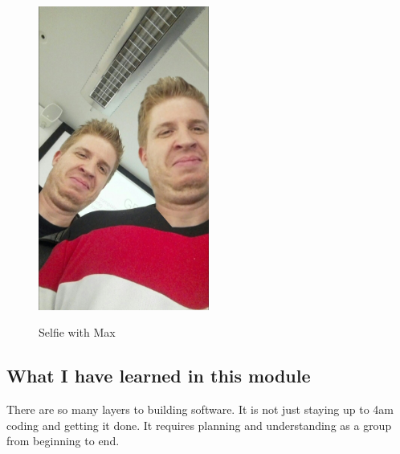 \begin{figure}[h]
\caption{Selfie with Max}
\centering
\includegraphics[width=0.5\textwidth]{af48bcf9-8756-467e-bd54-b3275c9d5df9.jpg}
\label{fig:selfie}
\end{figure}



\subsection{What I have learned in this module}
There are so many layers to building software. It is not just staying up to 4am coding and getting it done. It requires planning and understanding as a group from beginning to end.

